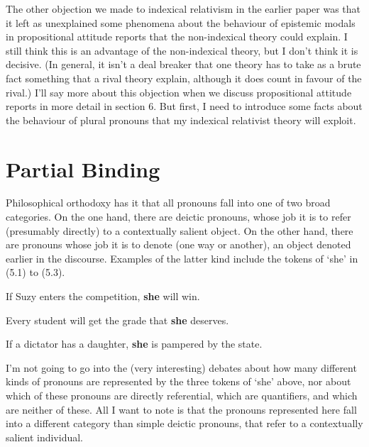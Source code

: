 The other objection we made to indexical relativism in the earlier paper was that it left as unexplained some phenomena about the behaviour of epistemic modals in propositional attitude reports that the non-indexical theory could explain. I still think this is an advantage of the non\nobreakdash-indexical theory, but I don't think it is decisive. (In general, it isn't a deal breaker that one theory has to take as a brute fact something that a rival theory explain, although it does count in favour of the rival.) I'll say more about this objection when we discuss propositional attitude reports in more detail in section 6. But first, I need to introduce some facts about the behaviour of plural pronouns that my indexical relativist theory will exploit.


\section{Partial Binding}

Philosophical orthodoxy has it that all pronouns fall into one of two broad categories. On the one hand, there are deictic pronouns, whose job it is to refer (presumably directly) to a contextually salient object. On the other hand, there are pronouns whose job it is to denote (one way or another), an object denoted earlier in the discourse. Examples of the latter kind include the tokens of `she' in (5.1) to (5.3).

\renewcommand{\labelenumi}{(5.\arabic{enumi})}
\begin{enumerate*}
\setcounter{enumi}{0}
\item If Suzy enters the competition, \textbf{she} will win.

\item Every student will get the grade that \textbf{she} deserves.

\item If a dictator has a daughter, \textbf{she} is pampered by the state.
\end{enumerate*}

\noindent I'm not going to go into the (very interesting) debates about how many different kinds of pronouns are represented by the three tokens of `she' above, nor about which of these pronouns are directly referential, which are quantifiers, and which are neither of these. All I want to note is that the pronouns represented here fall into a different category than simple deictic pronouns, that refer to a contextually salient individual.

